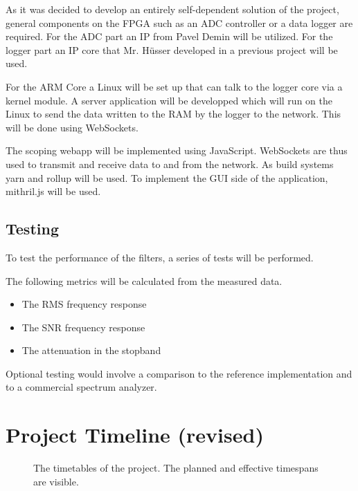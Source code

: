 \documentclass[a4paper,oneside]{alpenspecs/alpenspecs}
\begin{document}
As it was decided to develop an entirely self-dependent solution of the project, general components on the FPGA such as an ADC controller or a data logger are required. For the ADC part an IP from Pavel Demin will be utilized. For the logger part an IP core that Mr. Hüsser developed in a previous project will be used.

For the ARM Core a Linux will be set up that can talk to the logger core via a kernel module. A server application will be developped which will run on the Linux to send the data written to the RAM by the logger to the network. This will be done using WebSockets.

The scoping webapp will be implemented using JavaScript. WebSockets are thus used to transmit and receive data to and from the network.
As build systems yarn and rollup will be used. To implement the GUI side of the application, mithril.js will be used.

\section{Testing}

To test the performance of the filters, a series of tests will be performed.

The following metrics will be calculated from the measured data.

\begin{itemize}
    \item The RMS frequency response
    \item The SNR frequency response
    \item The attenuation in the stopband
\end{itemize}

Optional testing would involve a comparison to the reference implementation and to a commercial spectrum analyzer.

\chapter{Project Timeline (revised)} %
\label{ch:initial}

\begin{a3pages} %
    \begin{figure}
        \centering
        
        \caption{The timetables of the project. The planned and effective timespans are visible.}
    \end{figure}
\end{a3pages}
\end{document}
